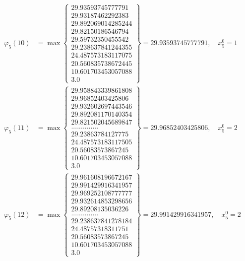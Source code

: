 \documentclass{article}
\begin{document}
\begin{align*}
  
  
  
\varphi_{5}(10) &= \max \left\{ \begin{array}{c}
29.93593745777791 \\
 29.93187462292383 \\
 29.892069014285244 \\
 29.82150186546794 \\
 29.59732350455542 \\
 29.238637841244355 \\
 24.487573183117075 \\
 20.560835738672445 \\
 10.601703453057088 \\
 3.0
\end{array} \right\} = 29.93593745777791, \quad x_{5}^0 = 1\\
  
  
  
  
\varphi_{5}(11) &= \max \left\{ \begin{array}{c}
29.958843339861808 \\
 29.96852403425806 \\
 29.932602697443546 \\
 29.892081170140354 \\
 29.821502045689847 \\
 .............. \\
 29.23863784127775 \\
 24.487573183117505 \\
 20.56083573867245 \\
 10.601703453057088 \\
 3.0
\end{array} \right\} = 29.96852403425806, \quad x_{5}^0 = 2\\
  
  
  
  
\varphi_{5}(12) &= \max \left\{ \begin{array}{c}
29.961608196672167 \\
 29.991429916341957 \\
 29.969252108777777 \\
 29.932614853298656 \\
 29.89208135036226 \\
 .............. \\
 29.238637841278184 \\
 24.48757318311751 \\
 20.56083573867245 \\
 10.601703453057088 \\
 3.0
\end{array} \right\} = 29.991429916341957, \quad x_{5}^0 = 2\\
  

\end{align*}
\end{document}
